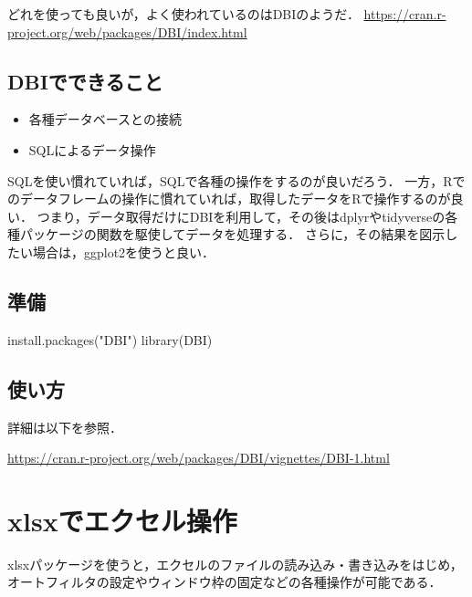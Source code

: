 \documentclass[
]{article}
\newenvironment{Shaded}{\begin{snugshade}}{\end{snugshade}}
\newcommand{\FunctionTok}[1]{\textcolor[rgb]{0.00,0.00,0.00}{#1}}
\newcommand{\NormalTok}[1]{#1}
\newcommand{\StringTok}[1]{\textcolor[rgb]{0.31,0.60,0.02}{#1}}
\providecommand{\tightlist}{%
  \setlength{\itemsep}{0pt}\setlength{\parskip}{0pt}}
\begin{document}
どれを使っても良いが，よく使われているのはDBIのようだ．
\url{https://cran.r-project.org/web/packages/DBI/index.html}

\hypertarget{dbiux3067ux3067ux304dux308bux3053ux3068}{%
\subsection{DBIでできること}\label{dbiux3067ux3067ux304dux308bux3053ux3068}}

\begin{itemize}
\tightlist
\item
  各種データベースとの接続\\
\item
  SQLによるデータ操作
\end{itemize}

SQLを使い慣れていれば，SQLで各種の操作をするのが良いだろう．
一方，Rでのデータフレームの操作に慣れていれば，取得したデータをRで操作するのが良い．
つまり，データ取得だけにDBIを利用して，その後はdplyrやtidyverseの各種パッケージの関数を駆使してデータを処理する．
さらに，その結果を図示したい場合は，ggplot2を使うと良い．

\hypertarget{ux6e96ux5099-3}{%
\subsection{準備}\label{ux6e96ux5099-3}}

\begin{Shaded}
\begin{Highlighting}[]
\FunctionTok{install.packages}\NormalTok{(}\StringTok{"DBI"}\NormalTok{)}
\FunctionTok{library}\NormalTok{(DBI)}
\end{Highlighting}
\end{Shaded}

\hypertarget{ux4f7fux3044ux65b9-6}{%
\subsection{使い方}\label{ux4f7fux3044ux65b9-6}}

詳細は以下を参照．

\url{https://cran.r-project.org/web/packages/DBI/vignettes/DBI-1.html}

\hypertarget{xlsx}{%
\section{xlsxでエクセル操作}\label{xlsx}}

xlsxパッケージを使うと，エクセルのファイルの読み込み・書き込みをはじめ，
オートフィルタの設定やウィンドウ枠の固定などの各種操作が可能である．
\end{document}
